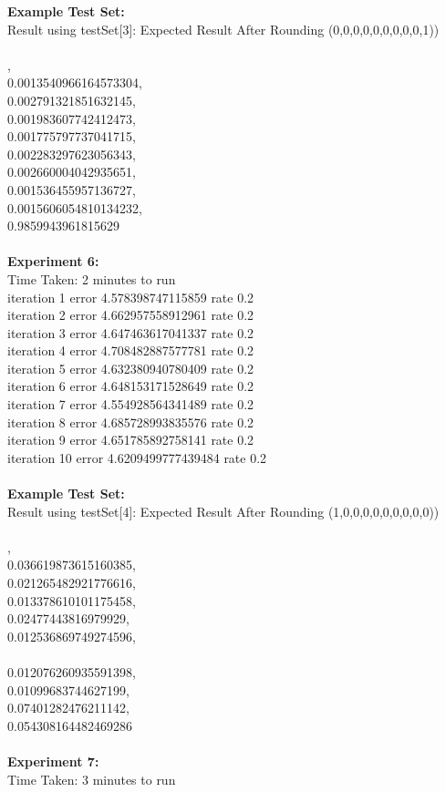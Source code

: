 \documentclass[11pt]{article}
\begin{document}
\begin{page}
\noindent \textbf{Example Test Set:}\\
Result using testSet[3]: Expected Result After Rounding (0,0,0,0,0,0,0,0,0,1))\\\\

,\\
  0.0013540966164573304,\\
  0.002791321851632145,\\
  0.001983607742412473,\\
  0.001775797737041715,\\
  0.002283297623056343,\\
  0.002660004042935651,\\
  0.001536455957136727,\\
  0.0015606054810134232,\\
  0.9859943961815629\\
\\
\noindent \textbf{Experiment 6:} \\
Time Taken: 2 minutes to run\\

\noindent iteration 1 error 4.578398747115859 rate 0.2\\
iteration 2 error 4.662957558912961 rate 0.2\\
iteration 3 error 4.647463617041337 rate 0.2\\
iteration 4 error 4.708482887577781 rate 0.2\\
iteration 5 error 4.632380940780409 rate 0.2\\
iteration 6 error 4.648153171528649 rate 0.2\\
iteration 7 error 4.554928564341489 rate 0.2\\
iteration 8 error 4.685728993835576 rate 0.2\\
iteration 9 error 4.651785892758141 rate 0.2\\
iteration 10 error 4.6209499777439484 rate 0.2\\\\

\noindent \textbf{Example Test Set:}\\
Result using testSet[4]: Expected Result After Rounding (1,0,0,0,0,0,0,0,0,0))\\\\

,\\
  0.036619873615160385,\\
  0.021265482921776616,\\
  0.013378610101175458,\\
  0.02477443816979929,\\
  0.012536869749274596,\\\\
  0.012076260935591398,\\
  0.01099683744627199,\\
  0.07401282476211142,\\
  0.054308164482469286\\
\\
\noindent \textbf{Experiment 7:} \\
Time Taken: 3 minutes to run\\


\end{page}
\end{document}
